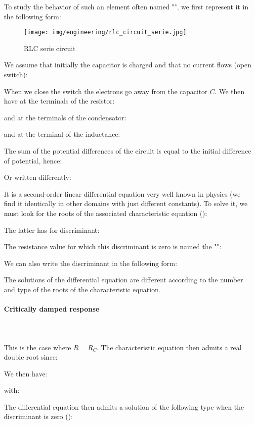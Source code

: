 	To study the behavior of such an element often named "", we first represent it in the following form:
	\begin{figure}[H]
		\centering
		\texttt{[image: img/engineering/rlc\_circuit\_serie.jpg]}
		\caption{RLC serie circuit}
	\end{figure}
	We assume that initially the capacitor is charged and that no current flows (open switch):
	
	When we close the switch the electrons go away from the capacitor $C$. We then have at the terminals of the resistor:
	
	and at the terminals of the condensator:
	
	and at the terminal of the inductance:
	
	The sum of the potential differences of the circuit is equal to the initial difference of potential, hence:
	
	Or written differently:
	
	It is a second-order linear differential equation very well known in physics (we find it identically in other domains with just different constants). To solve it, we must look for the roots of the associated characteristic equation ():
	
	The latter has for discriminant:
	
	The resistance value for which this discriminant is zero is named the "":
	
	We can also write the discriminant in the following form:
	
	The solutions of the differential equation are different according to the number and type of the roots of the characteristic equation.
	
	\pagebreak
	\paragraph{Critically damped response}\mbox{}\\\\
	This is the case where $R=R_C$. The characteristic equation then admits a real double root since:
	
	We then have:
	
	with:
	
	The differential equation then admits a solution of the following type when the discriminant is zero ():
	
